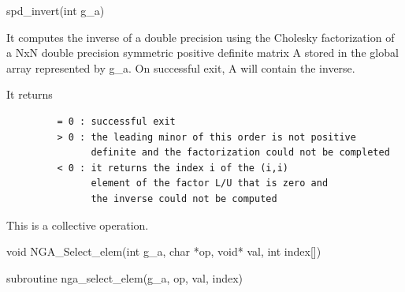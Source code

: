\documentclass[12pt]{article}
\begin{document}
\begin{pyapi}
\begin{pycode}
spd_invert(int g_a) 
\end{pycode}
\end{pyapi} 



\begin{desc}


It computes the inverse of a double precision using the Cholesky 
factorization of a NxN double precision symmetric positive definite 
matrix A stored in the global array represented by g_a. On successful 
exit, A will contain the inverse.

It returns
\begin{verbatim}
         = 0 : successful exit
         > 0 : the leading minor of this order is not positive
               definite and the factorization could not be completed
         < 0 : it returns the index i of the (i,i)
               element of the factor L/U that is zero and
               the inverse could not be computed
\end{verbatim}

This is a collective operation.
\end{desc}


\begin{capi}
\begin{ccode}

void NGA_Select_elem(int g_a, char *op, void* val, int index[])
\end{ccode}
\begin{funcargs}
\end{funcargs}
\end{capi}

\begin{fapi}
\begin{fcode}
subroutine nga_select_elem(g_a, op, val, index)
\end{fcode}
\begin{funcargs}
\end{funcargs}
\end{fapi}
\end{document}
